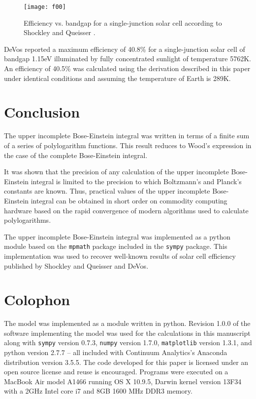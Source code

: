 \documentclass[letterpaper,12pt]{article}
\begin{document}
\begin{figure}
\texttt{[image: f00]}
\caption{Efficiency vs. bandgap for a single-junction solar cell according to Shockley and Queisser \cite{10.1063/1.1736034}.}
\label{fig:00}
\end{figure}


DeVos \cite{9780198513926} reported a maximum efficiency of 40.8\% for a single-junction solar cell of bandgap 1.15eV illuminated by fully concentrated sunlight of temperature 5762K. An efficiency of 40.5\% was calculated using the derivation described in this paper under identical conditions and assuming the temperature of Earth is 289K.


\section{Conclusion}
The upper incomplete Bose-Einstein integral was written in terms of a finite sum of a series of polylogarithm functions. This result reduces to Wood's expression in the case of the complete Bose-Einstein integral. 

It was shown that the precision of any calculation of the upper incomplete Bose-Einstein integral is limited to the precision to which Boltzmann's and Planck's constants are known. Thus, practical values of the upper incomplete Bose-Einstein integral can be obtained in short order on commodity computing hardware based on the rapid convergence of modern algorithms used to calculate polylogarithms.

The upper incomplete Bose-Einstein integral was implemented as a python module based on the \texttt{mpmath} package included in the \texttt{sympy} package. This implementation was used to recover well-known results of solar cell efficiency published by Shockley and Queisser and DeVos.


\section{Colophon}
The model was implemented as a module written in python. Revision 1.0.0 \cite{10.6084/m9.figshare.1229713} of the software implementing the model was used for the calculations in this manuscript along with \texttt{sympy} version 0.7.3, \texttt{numpy} version 1.7.0, \texttt{matplotlib} version 1.3.1, and python version 2.7.7 -- all included with Continuum Analytics's Anaconda distribution version 3.5.5. The code developed for this paper is licensed under an open source license and reuse is encouraged. Programs were executed on a MacBook Air model A1466 running OS X 10.9.5, Darwin kernel version 13F34 with a 2GHz Intel core i7 and 8GB 1600 MHz DDR3 memory.
\end{document}
